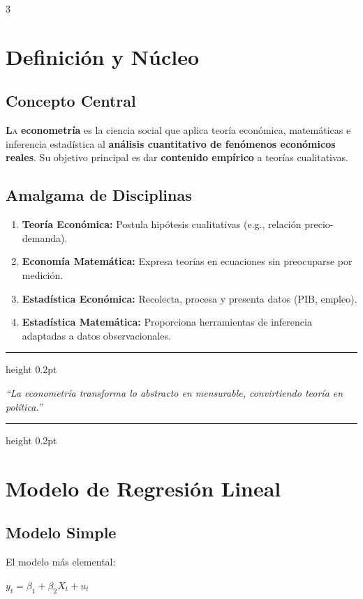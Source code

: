 \documentclass[9pt, spanish, twoside]{article}
\newcommand{\vogueQuote}[1]{
    \begin{center}
        \vspace{6pt}
        {\color{Champagne}\hrule height 0.2pt}
        \vspace{5pt}
        {\fontsize{11}{14} \selectfont \itshape \color{VogueBlack} ``#1''}
        \vspace{5pt}
        {\color{Champagne}\hrule height 0.2pt}
        \vspace{6pt}
    \end{center}
}
\newcommand{\critical}[1]{\textcolor{CriticalRed}{\textbf{#1}}}
\newcommand{\eqbox}[1]{\colorbox{TitaniumGray}{$\displaystyle #1$}}
\begin{document}
\begin{multicols*}{3}
\setlength{\columnseprule}{0pt}

\section{Definición y Núcleo}
\subsection{Concepto Central}
\lettrine[lines=2, nindent=0pt]{\textbf{\textcolor{Champagne}{L}}}{a} \textbf{econometría} es la ciencia social que aplica teoría económica, matemáticas e inferencia estadística al \critical{análisis cuantitativo de fenómenos económicos reales}. Su objetivo principal es dar \textbf{contenido empírico} a teorías cualitativas.

\subsection{Amalgama de Disciplinas}
\begin{enumerate}[leftmargin=8pt, noitemsep, topsep=2pt]
    \item \textbf{Teoría Económica:} Postula hipótesis cualitativas (e.g., relación precio-demanda).
    \item \textbf{Economía Matemática:} Expresa teorías en ecuaciones sin preocuparse por medición.
    \item \textbf{Estadística Económica:} Recolecta, procesa y presenta datos (PIB, empleo).
    \item \textbf{Estadística Matemática:} Proporciona herramientas de inferencia adaptadas a datos observacionales.
\end{enumerate}

\vogueQuote{La econometría transforma lo abstracto en mensurable, convirtiendo teoría en política.}

\section{Modelo de Regresión Lineal}
\subsection{Modelo Simple}
El modelo más elemental:

\vspace{2pt}
\eqbox{y_t = \beta_1 + \beta_2 X_t + u_t}
\vspace{2pt}


\end{multicols*}
\end{document}
